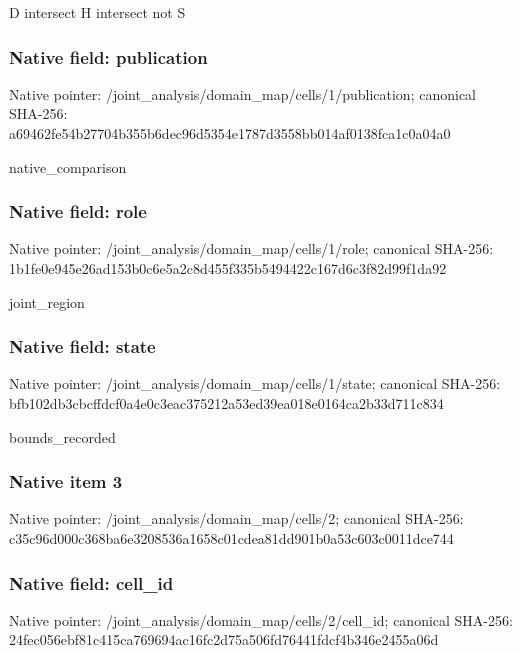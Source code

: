 \documentclass[10pt,a4paper]{article}
\begin{document}
D intersect H intersect not S


\subsubsection{Native field: publication}


Native pointer: /joint\_analysis/domain\_m\allowbreak{}ap/cells/1/publication; canonical SHA-256: a69462fe54b27704b355b6de\allowbreak{}c96d5354e1787d3558bb014a\allowbreak{}f0138fca1c0a04a0


native\_comparison


\subsubsection{Native field: role}


Native pointer: /joint\_analysis/domain\_map/cells/1/role; canonical SHA-256: 1b1fe0e945e26ad153b0c6e5\allowbreak{}a2c8d455f335b5494422c167\allowbreak{}d6c3f82d99f1da92


joint\_region


\subsubsection{Native field: state}


Native pointer: /joint\_analysis/domain\_m\allowbreak{}ap/cells/1/state; canonical SHA-256: bfb102db3cbcffdcf0a4e0c3\allowbreak{}eac375212a53ed39ea018e01\allowbreak{}64ca2b33d711c834


bounds\_recorded


\subsubsection{Native item 3}


Native pointer: /joint\_analysis/domain\_map/cells/2; canonical SHA-256: c35c96d000c368ba6e320853\allowbreak{}6a1658c01cdea81dd901b0a5\allowbreak{}3c603c0011dce744



\subsubsection{Native field: cell\_id}


Native pointer: /joint\_analysis/domain\_m\allowbreak{}ap/cells/2/cell\_id; canonical SHA-256: 24fec056ebf81c415ca76969\allowbreak{}4ac16fc2d75a506fd76441fd\allowbreak{}cf4b346e2455a06d
\end{document}
